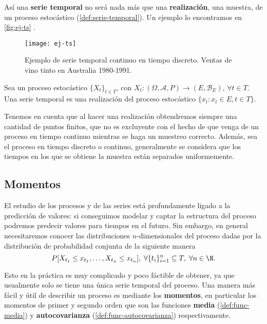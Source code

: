 Así una \textbf{serie temporal} no será nada más que una \textbf{realización}, una muestra, de un proceso estocástico (\autoref{def:serie-temporal}). Un ejemplo lo encontramos en \autoref{fig:ej-ts} \cite{brockwell2002introduction}.

\begin{figure}[htpb]
  \centering
  \texttt{[image: ej-ts]}
  \caption{Ejemplo de serie temporal continuo en tiempo discreto. Ventas de vino tinto en Australia 1980-1991.}
  \label{fig:ej-ts}
\end{figure}

\begin{definicion}
  Sea un proceso estocástico $\{X_t\}_{t \in T}$, con $X_t : (\Omega, \mathcal{A}, P) \to (E, \mathcal{B}_E), \, \forall t \in T$. Una serie temporal es una realización del proceso estocástico $\{x_t : x_t \in E, t \in T \}$.
  \label{def:serie-temporal}
\end{definicion}

Tenemos en cuenta que al hacer una realización obtendremos siempre una cantidad de puntos finitos, que no es excluyente con el hecho de que venga de un proceso en tiempo continuo mientras se haga un muestreo correcto. Además, sea el proceso en tiempo discreto o continuo, generalmente se considera que los tiempos en los que se obtiene la muestra están separados uniformemente.

\subsection{Momentos}

El estudio de los procesos y de las series está profundamente ligado a la predicción de valores: si conseguimos modelar y captar la estructura del proceso podremos predecir valores para tiempos en el futuro. Sin embargo, en general necesitaremos conocer las distribuciones $n$-dimensionales del proceso dadas por la distribución de probabilidad conjunta de la siguiente manera
\begin{equation*}
  P[X_{t_1} \leq x_{t_1}, \ldots, X_{t_n} \leq x_{t_n}], \; \forall \{t_i\}^n_{i = 1} \subseteq T, \; \forall n \in \N.
  \label{eq:distri-multidim}
\end{equation*}

Esto en la práctica es muy complicado y poco fáctible de obtener, ya que usualmente solo se tiene una única serie temporal del proceso. Una manera más fácil y útil de describir un proceso es mediante los \textbf{momentos}, en particular los momentos de primer y segundo orden que son las funciones \textbf{media} (\autoref{def:func-media}) y \textbf{autocovarianza} (\autoref{def:func-autocovarianza}) respectivamente.

